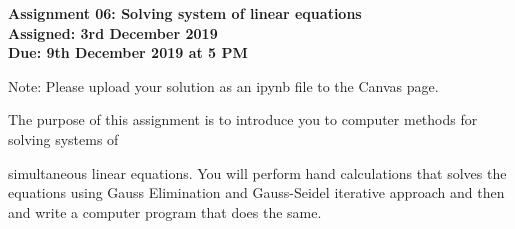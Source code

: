 \documentclass[a4paper,12pt]{article}
\begin{document}
\begin{centering}
	\textbf{
		Assignment 06: Solving system of linear equations\\
		Assigned: 3rd December 2019\\
		Due: 9th December 2019 at 5 PM\\
	}
\end{centering}


Note: Please upload your solution as an ipynb file to the Canvas page.

\vspace{1em}
 
 The purpose of this assignment is to introduce you to computer methods for solving systems of

 simultaneous linear equations. You will perform hand calculations that solves the equations using
Gauss Elimination and Gauss-Seidel iterative approach and then and write a computer program that does the same.
 
\end{document}
